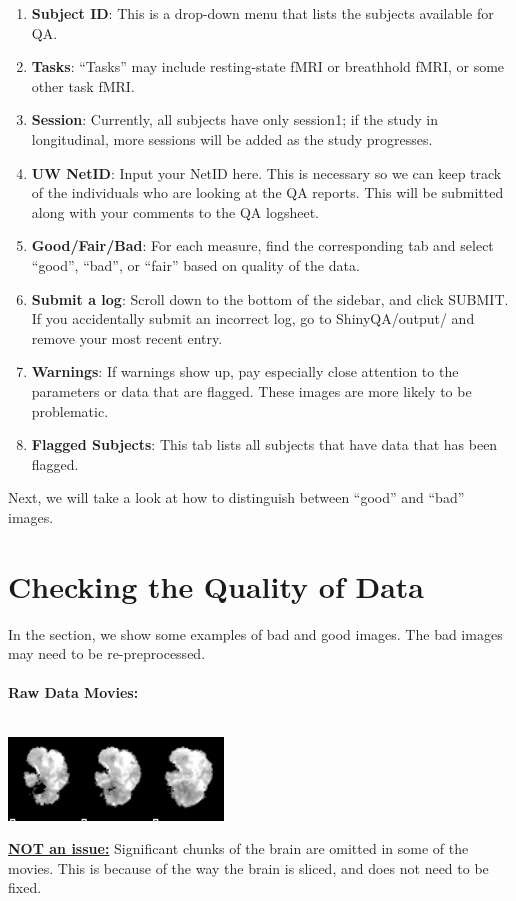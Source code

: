 \documentclass[12pt]{article}
\begin{document}
\begin{enumerate}
	\item \textbf{Subject ID}: This is a drop-down menu that lists the subjects available for QA.
	\item \textbf{Tasks}: ``Tasks'' may include resting-state fMRI or breathhold fMRI, or some other task fMRI.
	\item \textbf{Session}: Currently, all subjects have only session1; if the study in longitudinal, more sessions will be added as the study progresses.
	\item \textbf{UW NetID}: Input your NetID here. This is necessary so we can keep track of the individuals who are looking at the QA reports. This will be submitted along with your comments to the QA logsheet.
	\item \textbf{Good/Fair/Bad}: For each measure, find the corresponding tab and select ``good'', ``bad'', or ``fair'' based on quality of the data. 
	\item \textbf{Submit a log}: Scroll down to the bottom of the sidebar, and click SUBMIT. If you accidentally submit an incorrect log, go to ShinyQA/output/ and remove your most recent entry. 
	\item \textbf{Warnings}: If warnings show up, pay especially close attention to the parameters or data that are flagged. These images are more likely to be problematic.
	\item \textbf{Flagged Subjects}: This tab lists all subjects that have data that has been flagged. 
\end{enumerate}

Next, we will take a look at how to distinguish between ``good'' and ``bad'' images. 

\section{Checking the Quality of Data}

In the section, we show some examples of bad and good images. The bad images may need to be re-preprocessed. 
\\
\\
\large{\textbf{Raw Data Movies:}}
\\\\
\noindent\begin{minipage}{0.45\textwidth}
	\includegraphics[scale=0.85]{bad_image2.png}
\end{minipage}%
\hfill%
\begin{minipage}{0.45\textwidth}
	\underline{\textbf{NOT an issue:}} Significant chunks of the brain are omitted in some of the movies. This is because of the way the brain is sliced, and does not need to be fixed.
	\\
\end{minipage}\newline\newline
\end{document}
